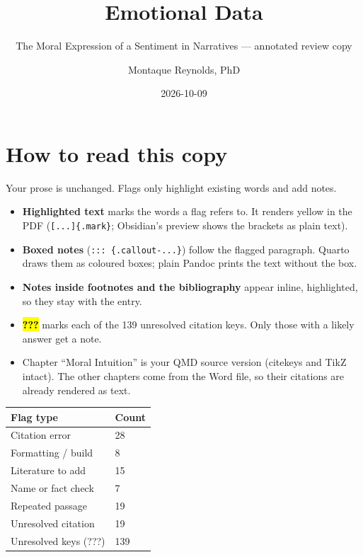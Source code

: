 \documentclass[
  letterpaper,
  DIV=11,
  numbers=noendperiod]{scrartcl}
\title{Emotional Data}
\subtitle{The Moral Expression of a Sentiment in Narratives ---
annotated review copy}
\author{Montaque Reynolds, PhD}
\date{2026-10-09}
\newcounter{none} %
\providecommand{\tightlist}{%
  \setlength{\itemsep}{0pt}\setlength{\parskip}{0pt}}
\theoremstyle{remark}
\begin{document}
\maketitle


\section*{How to read this copy}\label{how-to-read-this-copy}

Your prose is unchanged. Flags only highlight existing words and add
notes.

\begin{itemize}
\tightlist
\item
  \textbf{Highlighted text} marks the words a flag refers to. It renders
  yellow in the PDF (\texttt{{[}...{]}\{.mark\}}; Obsidian's preview
  shows the brackets as plain text).
\item
  \textbf{Boxed notes} (\texttt{:::\ \{.callout-...\}}) follow the
  flagged paragraph. Quarto draws them as coloured boxes; plain Pandoc
  prints the text without the box.
\item
  \textbf{Notes inside footnotes and the bibliography} appear inline,
  highlighted, so they stay with the entry.
\item
  \textbf{\hl{???}} marks each of the 139 unresolved citation keys. Only
  those with a likely answer get a note.
\item
  Chapter ``Moral Intuition'' is your QMD source version (citekeys and
  TikZ intact). The other chapters come from the Word file, so their
  citations are already rendered as text.
\end{itemize}

{\def\LTcaptype{none} %
\begin{longtable}[]{@{}ll@{}}
\toprule\noalign{}
Flag type & Count \\
\midrule\noalign{}
\endhead
\bottomrule\noalign{}
\endlastfoot
Citation error & 28 \\
Formatting / build & 8 \\
Literature to add & 15 \\
Name or fact check & 7 \\
Repeated passage & 19 \\
Unresolved citation & 19 \\
Unresolved keys (???) & 139 \\
\end{longtable}
}
\end{document}

